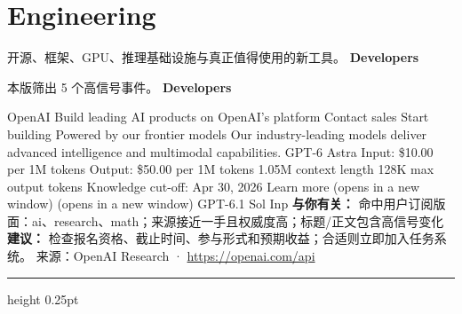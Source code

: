 \documentclass[10.5pt]{ctexart}
\begin{document}
\section*{Engineering}
{\color{ormuted} 开源、框架、GPU、推理基础设施与真正值得使用的新工具。}
\vspace{2mm}
{\LARGE\bfseries Developers}\par
\vspace{1mm}
{\color{ormuted} 本版筛出 5 个高信号事件。}
\vspace{3mm}
{\Large\bfseries Developers}\par
OpenAI Build leading AI products on OpenAI’s platform Contact sales Start building Powered by our frontier models Our industry-leading models deliver advanced intelligence and multimodal capabilities. GPT-6 Astra Input: \$10.00 per 1M tokens Output: \$50.00 per 1M tokens 1.05M context length 128K max output tokens Knowledge cut-off: Apr 30, 2026 Learn more (opens in a new window) (opens in a new window) GPT-6.1 Sol Inp
\textbf{与你有关：} 命中用户订阅版面：ai、research、math；来源接近一手且权威度高；标题/正文包含高信号变化
\textbf{建议：} 检查报名资格、截止时间、参与形式和预期收益；合适则立即加入任务系统。
{\footnotesize\color{ormuted} 来源：OpenAI Research · \url{https://openai.com/api}}
\vspace{4mm}
\hrule height 0.25pt
\vspace{3mm}
\end{document}
